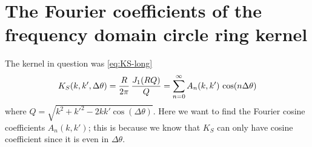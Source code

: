 \documentclass[11pt,a4paper, 
swedish, english %
]{article}
\begin{document}
\begin{comment}
\subsubsection{Improving this method using Simpson's rule}
\todo[inline]{\url{https://math.stackexchange.com/questions/898087/discretization-of-an-integral}\\
Will this even work?}
The main bottle neck in the numerical solution of \eqref{eq:int-eig}
is the eigenvalue and eigenvector calculation. It would therefore be
desirable to keep $N$ small. On the other hand, to accurately
approximate the integral using \eqref{eq:inttosum}, $N$ has to be
large. 
The simple Riemann sum approximation, \eqref{eq:inttosum}, is one of
the most rudimentary integral discretizations. A good way to improve
numerical accuracy without sacrificing computation time in the
eigenvalue calculations, would be to use a better discretization
method. 

One such method is Simpson's rule (some times also refered to as
Simpson's $\nicefrac13$ rule)
\begin{equation}
\int_{k_{n-1}}^{k_{n+1}}f(k)\id{k} \approx 
\frac{\Delta{k}}{3} \Big[f(k_{n-1}) + 4f(k_n) + f(k_{n+1})\Big].
\end{equation}
\end{comment}













\clearpage
\appendix

\section{The Fourier coefficients of the frequency domain 
circle ring kernel}\label{apx:KS}
The kernel in question was \eqref{eq:KS-long}
\begin{equation}
K_S(k, k', \Delta\theta) = \frac{R}{2\pi}\,\frac{J_1\qty(RQ)}{Q}
=\sum_{n=0}^\infty A_{n}(k, k')\, \cos(n\Delta\theta)
\end{equation}
where $Q=\sqrt{k^2+{k'}^2-2kk'\cos(\Delta\theta)}$. Here we want to
find the Fourier cosine coefficients $A_n(k, k')$; this is because we
know that $K_S$ can only have cosine coefficient since it is even in
$\Delta\theta$. 
\end{document}
